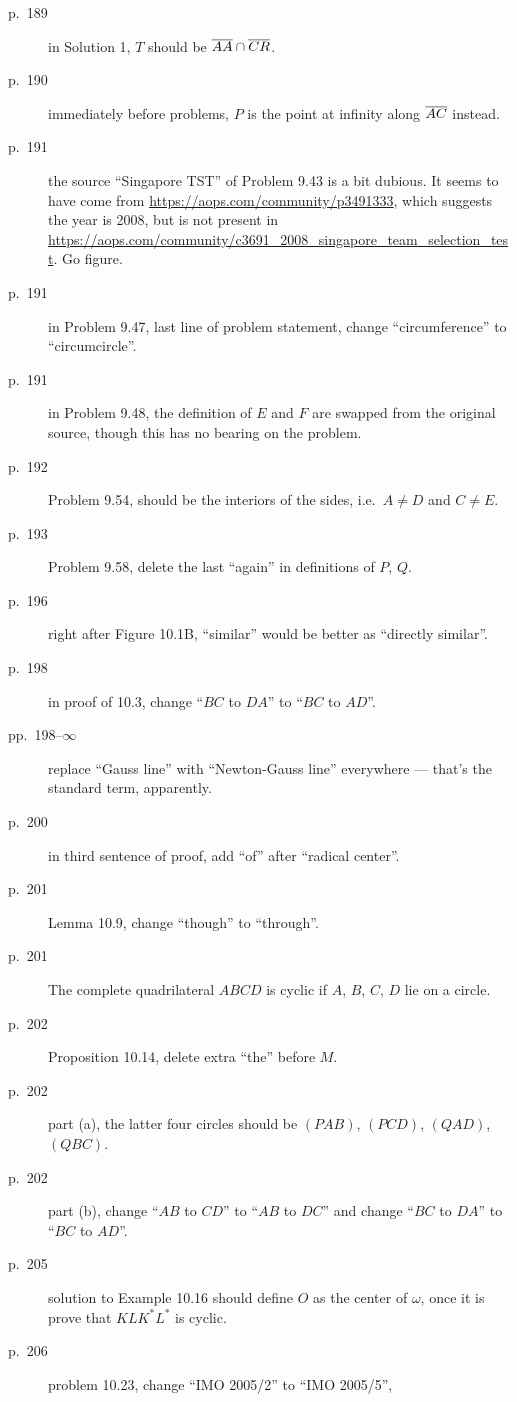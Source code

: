 \documentclass[11pt]{scrartcl}
\begin{document}
\begin{description}
\item[p.\  189] in Solution 1, $T$ should be $\overline{AA} \cap \overline{CR}$.
\item[p.\  190] immediately before problems, $P$ is the point at infinity along $\overline{AC}$ instead.
\item[p.\  191] the source ``Singapore TST'' of Problem 9.43 is a bit dubious.
  It seems to have come from \url{https://aops.com/community/p3491333},
  which suggests the year is 2008,
  but is not present in \url{https://aops.com/community/c3691_2008_singapore_team_selection_test}.
  Go figure.
\item[p.\  191] in Problem 9.47, last line of problem statement,
  change ``circumference'' to ``circumcircle''.
\item[p.\  191] in Problem 9.48, the definition of $E$ and $F$ are swapped from
  the original source, though this has no bearing on the problem.
\item[p.\  192] Problem 9.54, should be the interiors of the sides, i.e.\ $A \neq D$ and $C \neq E$.
\item[p.\  193] Problem 9.58, delete the last ``again'' in definitions of $P$, $Q$.
\item[p.\  196] right after Figure 10.1B, ``similar'' would be better as ``directly similar''.
\item[p.\  198] in proof of 10.3, change ``$BC$ to $DA$'' to ``$BC$ to $AD$''.
\item[pp.\  198--$\infty$] replace ``Gauss line'' with ``Newton-Gauss line''
  everywhere --- that's the standard term, apparently.
\item[p.\  200] in third sentence of proof, add ``of'' after ``radical center''.
\item[p.\  201] Lemma 10.9, change ``though'' to ``through''.
\item[p.\  201] The complete quadrilateral $ABCD$ is cyclic if $A$, $B$, $C$, $D$ lie on a circle.
\item[p.\  202] Proposition 10.14, delete extra ``the'' before $M$.
\item[p.\  202] part (a), the latter four circles should be
  $(PAB)$, $(PCD)$, $(QAD)$, $(QBC)$.
\item[p.\  202] part (b), change ``$AB$ to $CD$'' to ``$AB$ to $DC$''
  and change ``$BC$ to $DA$'' to ``$BC$ to $AD$''.
\item[p.\  205] solution to Example 10.16 should define $O$ as the center of $\omega$,
  once it is prove that $KL K^\ast L^\ast$ is cyclic.
\item[p.\  206] problem 10.23, change ``IMO 2005/2'' to ``IMO 2005/5'',

\end{description}
\end{document}
